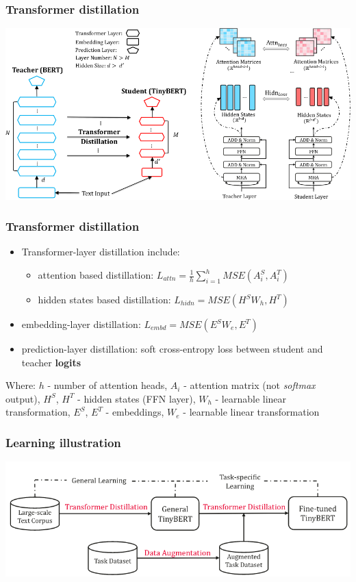 \documentclass{beamer}
\begin{document}
\begin{frame}
    \frametitle{Transformer distillation}
    \begin{center}
        \includegraphics[scale=0.34]{img/tiny_bert_overwiev.png}
    \end{center}
\end{frame}

\begin{frame}
    \frametitle{Transformer distillation}
    \begin{itemize}
        \item Transformer-layer distillation include:
        \begin{itemize}
          \item attention based distillation: $ L_{attn} = \frac{1}{h} \sum_{i = 1}^{h} MSE(A_i^S, A_i^T) \ $
          \item hidden states based distillation: $ L_{hidn} = MSE(H^S W_h, H^T) \ $
        \end{itemize}
        \item embedding-layer distillation: $ L_{embd} = MSE(E^S W_e, E^T) \ $
        \item prediction-layer distillation: soft cross-entropy loss between student and teacher \textbf{logits}
    \end{itemize}
    \tiny Where: $h$ - number of attention heads, $A_i$ - attention matrix (not \textit{softmax} output), $H^{S}$, $H^{T}$ - hidden states (FFN layer), $W_h$ - learnable linear transformation, $E^{S}$, $E^{T}$ - embeddings, $W_e$ - learnable linear transformation
\end{frame}

\begin{frame}
    \frametitle{Learning illustration}
    \begin{center}
        \includegraphics[scale=0.34]{img/tiny_bert_learing.png}
    \end{center}
\end{frame}
\end{document}
